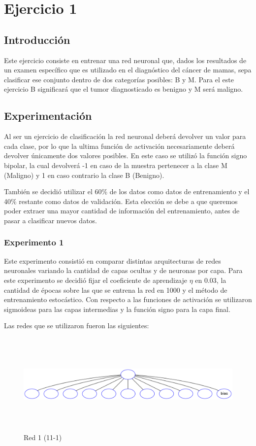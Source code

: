 \section{Ejercicio 1}

\subsection{Introducción}
Este ejercicio consiste en entrenar una red neuronal que, dados los resultados de un examen específico que es utilizado en el diagnóstico del
cáncer de mamas, sepa clasificar ese conjunto dentro de dos categorías posibles: B y M. Para el este ejercicio B significará que el tumor diagnosticado
es benigno y M será maligno.

\subsection{Experimentación}
Al ser un ejercicio de clasificación la red neuronal deberá devolver un valor para cada clase, por lo que la ultima función de activación necesariamente
deberá devolver únicamente dos valores posibles. En este caso se utilizó la función signo bipolar, la cual devolverá -1 en caso de la muestra pertenecer
a la clase M (Maligno) y 1 en caso contrario la clase B (Benigno).

También se decidió utilizar el 60\% de los datos como datos de entrenamiento y el 40\% restante como datos de validación. Esta elección se debe a que
queremos poder extraer una mayor cantidad de información del entrenamiento, antes de pasar a clasificar nuevos datos.

\subsubsection{Experimento 1}
Este experimento consistió en comparar distintas arquitecturas de redes neuronales variando la cantidad de capas ocultas y de neuronas por capa.
Para este experimento se decidió fijar el coeficiente de aprendizaje $\eta$ en 0.03, la cantidad de épocas sobre las que se entrena la red en 1000 y el
método de entrenamiento estocástico. Con respecto a las funciones de activación se utilizaron sigmoideas para las capas intermedias y la función signo
para la capa final.

Las redes que se utilizaron fueron las siguientes:

\begin{figure}[H]
  \includegraphics[width=12cm, height=5cm]{../plot/11-1.png}
  \centering
  \caption{Red 1 (11-1)}
\end{figure}

